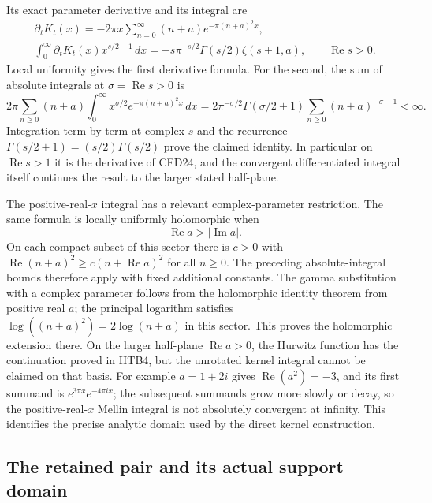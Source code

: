 Its exact parameter derivative and its integral are
\begin{equation}\tag{CFD25}
\begin{gathered}
 \partial_tK_t(x)
     =-2\pi x\sum_{n=0}^{\infty}(n+a)e^{-\pi(n+a)^2x},\\
 \int_0^\infty \partial_tK_t(x)x^{s/2-1}\,dx
     =-s\pi^{-s/2}\Gamma(s/2)\zeta(s+1,a),
                     \qquad\operatorname{Re}s>0.
\end{gathered}
\end{equation}
Local uniformity gives the first derivative formula. For the second,
the sum of absolute integrals at $\sigma=\operatorname{Re}s>0$ is
\[
 2\pi\sum_{n\ge0}(n+a)
 \int_0^\infty x^{\sigma/2}e^{-\pi(n+a)^2x}\,dx
 =2\pi^{-\sigma/2}\Gamma(\sigma/2+1)
       \sum_{n\ge0}(n+a)^{-\sigma-1}<\infty.
\]
Integration term by term at complex $s$ and the recurrence
$\Gamma(s/2+1)=(s/2)\Gamma(s/2)$ prove the claimed identity.
In particular on $\operatorname{Re}s>1$ it is the derivative
of CFD24, and the convergent differentiated integral itself
continues the result to the larger stated half-plane.

The positive-real-$x$ integral has a relevant complex-parameter
restriction. The same formula is locally uniformly holomorphic
when
\begin{equation}\tag{CFD26}
 \operatorname{Re}a>|\operatorname{Im}a|.
\end{equation}
On each compact subset of this sector there is $c>0$ with
$\operatorname{Re}(n+a)^2\ge c(n+\operatorname{Re}a)^2$ for all
$n\ge0$. The preceding absolute-integral bounds therefore apply
with fixed additional constants. The gamma substitution with a
complex parameter follows from the holomorphic identity theorem
from positive real $a$; the principal logarithm satisfies
$\log((n+a)^2)=2\log(n+a)$ in this sector. This proves the
holomorphic extension there. On the larger half-plane
$\operatorname{Re}a>0$, the Hurwitz function has the continuation
proved in HTB4, but the unrotated kernel integral cannot be claimed
on that basis. For example $a=1+2i$ gives
$\operatorname{Re}(a^2)=-3$, and its first summand is
$e^{3\pi x}e^{-4\pi i x}$; the subsequent summands grow more
slowly or decay, so the positive-real-$x$ Mellin integral is not
absolutely convergent at infinity. This identifies the precise
analytic domain used by the direct kernel construction.

\subsection{The retained pair and its actual support domain}

